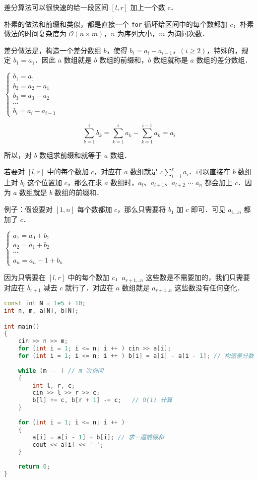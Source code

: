 
差分算法可以很快速的给一段区间 $[l, r]$ 加上一个数 $c$．

朴素的做法和前缀和类似，都是直接一个 \verb|for| 循坏给区间中的每个数都加 $c$，朴素做法的时间复杂度为 $\mathcal{O}(n \times m)$，$n$ 为序列大小，$m$ 为询问次数．

差分做法是，构造一个差分数组 $b$，使得 $b_i = a_i - a_{i - 1}$，$(i \geq 2)$，特殊的，规定 $b_1 = a_1$．因此 $a$ 数组就是 $b$ 数组的前缀和，$b$ 数组就称是 $a$ 数组的差分数组．

$\begin{cases}
b_1 = a_1 \\
b_2 = a_2 - a_1 \\
b_3 = a_3 - a_2 \\
\cdots \\
b_i = a_i - a_{i - 1}
\end{cases}$

\begin{equation}
\sum^i_{k = 1}b_k = \sum^{i}_{k = 1} a_k - \sum^{i - 1}_{k = 1} a_k = a_i
\end{equation}

所以，对 $b$ 数组求前缀和就等于 $a$ 数组．

若要对 $[l, r]$ 中的每个数加 $c$，对应在 $a$ 数组就是 $c\sum^r_{i= l}a_i$．可以直接在 $b$ 数组上对 $b_l$ 这个位置加 $c$，那么在求 $a$ 数组时，$a_l$、$a_{l + 1}$、$a_{l + 2}$ $\cdots$ $a_n$ 都会加上 $c$．因为 $a$ 数组就是 $b$ 数组的前缀和．

例子：假设要对 $[1, n]$ 每个数都加 $c$，那么只需要将 $b_1$ 加 $c$ 即可．可见 $a_{1 ... n}$ 都加了 $c$．

$\begin{cases}
a_1 = a_0 + b_1 \\
a_2 = a_1 + b_2 \\
\cdots \\ 
a_n = a_n - 1 + b_n
\end{cases}$

因为只需要在 $[l, r]$ 中的每个数加 $c$，$a_{r + 1 ... n}$ 这些数是不需要加的，我们只需要对应在 $b_{r + 1}$ 减去 $c$ 就行了．对应在 $a$ 数组就是 $a_{r + 1..n}$ 这些数没有任何变化．

\begin{lstlisting}[language=cpp]
const int N = 1e5 + 10;
int n, m, a[N], b[N];

int main() 
{
    cin >> n >> m;  
    for (int i = 1; i <= n; i ++ ) cin >> a[i];
    for (int i = 1; i <= n; i ++ ) b[i] = a[i] - a[i - 1]; // 构造差分数组
    
    while (m -- ) // m 次询问
    {
        int l, r, c;
        cin >> l >> r >> c;
        b[l] += c, b[r + 1] -= c;   // O(1) 计算
    }
    
    for (int i = 1; i <= n; i ++ ) 
    {
        a[i] = a[i - 1] + b[i]; // 求一遍前缀和
        cout << a[i] << ' ';   
    }
    
    return 0;
}
\end{lstlisting}
